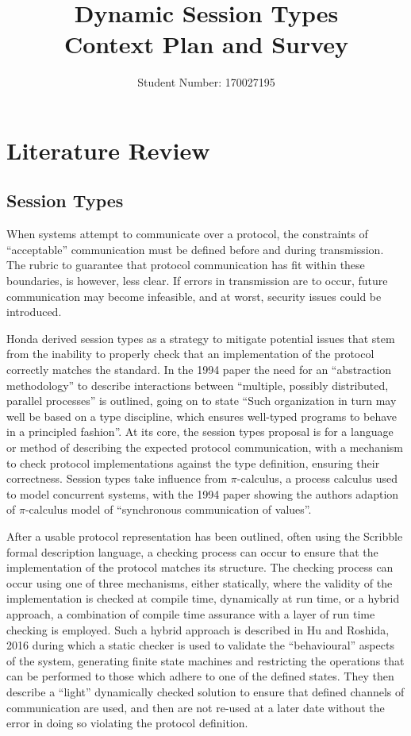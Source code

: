 \documentclass{article}
\author{Student Number: 170027195}
\title{Dynamic Session Types\\Context Plan and Survey}
\begin{document}
	\maketitle
	\pagebreak
	\tableofcontents
	\pagebreak
	\section{Literature Review}
	\subsection{Session Types} \label{session types}
	When systems attempt to communicate over a protocol, the constraints of “acceptable” communication must be defined before and during transmission. The rubric to guarantee that protocol communication has fit within these boundaries, is however, less clear. If errors in transmission are to occur, future communication may become infeasible, and at worst, security issues could be introduced.
	
	Honda derived session types\cite{honda1993types, takeuchi1994interaction, honda1998language} as a strategy to mitigate potential issues that stem from the inability to properly check that an implementation of the protocol correctly matches the standard. In the 1994 paper\cite{takeuchi1994interaction} the need for an ``abstraction methodology'' to describe interactions between ``multiple, possibly distributed, parallel	processes'' is outlined, going on to state ``Such organization in turn may well be based on a type discipline, which ensures well-typed programs to behave in a principled fashion''. At its core, the session types proposal is for a language or method of describing the expected protocol communication, with a mechanism to check protocol implementations against the type definition, ensuring their correctness. 	Session types take influence from $\pi$-calculus\cite{milner1999communicating}, a process calculus used to model concurrent systems, with the 1994 paper\cite{takeuchi1994interaction} showing the authors adaption of $\pi$-calculus model of ``synchronous communication of values''.
	
	After a usable protocol representation has been outlined, often using the Scribble formal description language\cite{honda2011scribbling}, a checking process can occur to ensure that the implementation of the protocol matches its structure. The checking process can occur using one of three mechanisms, either statically, where the validity of the implementation is checked at compile time, dynamically at run time, or a hybrid approach, a combination of compile time assurance with a layer of run time checking is employed. Such a hybrid approach is described in Hu and Roshida, 2016\cite{hu2016hybrid} during which a static checker is used to validate the ``behavioural'' aspects of the system, generating finite state machines and restricting the operations that can be performed to those which adhere to one of the defined states. They then describe a ``light'' dynamically checked solution to ensure that defined channels of communication are used, and then are not re-used at a later date without the error in doing so violating the protocol definition.
	
\end{document}
